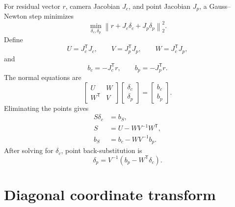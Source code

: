 \documentclass[11pt]{article}
\begin{document}
For residual vector $r$, camera Jacobian $J_c$, and point Jacobian $J_p$, a
Gauss--Newton step minimizes
\begin{equation}
  \min_{\delta_c,\delta_p}
  \left\|r + J_c\delta_c + J_p\delta_p\right\|_2^2.
\end{equation}
Define
\begin{equation}
  U = J_c^{\mathsf T}J_c,
  \qquad
  V = J_p^{\mathsf T}J_p,
  \qquad
  W = J_c^{\mathsf T}J_p,
\end{equation}
and
\begin{equation}
  b_c = -J_c^{\mathsf T}r,
  \qquad
  b_p = -J_p^{\mathsf T}r.
\end{equation}
The normal equations are
\begin{equation}
  \begin{bmatrix}
    U & W \\
    W^{\mathsf T} & V
  \end{bmatrix}
  \begin{bmatrix}
    \delta_c \\
    \delta_p
  \end{bmatrix}
  =
  \begin{bmatrix}
    b_c \\
    b_p
  \end{bmatrix}.
\end{equation}
Eliminating the points gives
\begin{align}
  S\delta_c &= b_S, \\
  S &= U-WV^{-1}W^{\mathsf T}, \\
  b_S &= b_c-WV^{-1}b_p.
\end{align}
After solving for $\delta_c$, point back-substitution is
\begin{equation}
  \delta_p = V^{-1}\left(b_p-W^{\mathsf T}\delta_c\right).
\end{equation}

\section{Diagonal coordinate transform}
\end{document}
